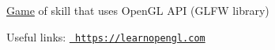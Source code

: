 \mbox{\hyperlink{class_game}{Game}} of skill that uses Open\+GL API (GLFW library)

Useful links\+: \href{https://learnopengl.com}{\texttt{ https\+://learnopengl.\+com}} 